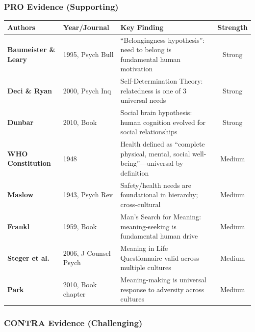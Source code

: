 \subsubsection{PRO Evidence (Supporting)}

\begin{center}
\scriptsize
\begin{longtable}{@{}p{3cm}p{2cm}p{6cm}c@{}}
\toprule
\textbf{Authors} & \textbf{Year/Journal} & \textbf{Key Finding} & \textbf{Strength} \\
\midrule
\endfirsthead
\bottomrule
\endlastfoot
\textbf{Baumeister \& Leary} & 1995, Psych Bull & ``Belongingness hypothesis'': need to belong is fundamental human motivation & Strong \\
\textbf{Deci \& Ryan} & 2000, Psych Inq & Self-Determination Theory: relatedness is one of 3 universal needs & Strong \\
\textbf{Dunbar} & 2010, Book & Social brain hypothesis: human cognition evolved for social relationships & Strong \\
\textbf{WHO Constitution} & 1948 & Health defined as ``complete physical, mental, social well-being''---universal by definition & Medium \\
\textbf{Maslow} & 1943, Psych Rev & Safety/health needs are foundational in hierarchy; cross-cultural & Medium \\
\textbf{Frankl} & 1959, Book & Man's Search for Meaning: meaning-seeking is fundamental human drive & Medium \\
\textbf{Steger et al.} & 2006, J Counsel Psych & Meaning in Life Questionnaire valid across multiple cultures & Medium \\
\textbf{Park} & 2010, Book chapter & Meaning-making is universal response to adversity across cultures & Medium \\
\end{longtable}
\end{center}

\subsubsection{CONTRA Evidence (Challenging)}

